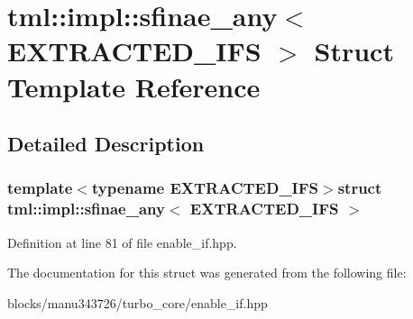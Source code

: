 \hypertarget{structtml_1_1impl_1_1sfinae__any}{\section{tml\+:\+:impl\+:\+:sfinae\+\_\+any$<$ E\+X\+T\+R\+A\+C\+T\+E\+D\+\_\+\+I\+F\+S $>$ Struct Template Reference}
\label{structtml_1_1impl_1_1sfinae__any}
}


\subsection{Detailed Description}
\subsubsection*{template$<$typename E\+X\+T\+R\+A\+C\+T\+E\+D\+\_\+\+I\+F\+S$>$struct tml\+::impl\+::sfinae\+\_\+any$<$ E\+X\+T\+R\+A\+C\+T\+E\+D\+\_\+\+I\+F\+S $>$}



Definition at line 81 of file enable\+\_\+if.\+hpp.



The documentation for this struct was generated from the following file\+:\begin{DoxyCompactItemize}
\item 
blocks/manu343726/turbo\+\_\+core/enable\+\_\+if.\+hpp\end{DoxyCompactItemize}
